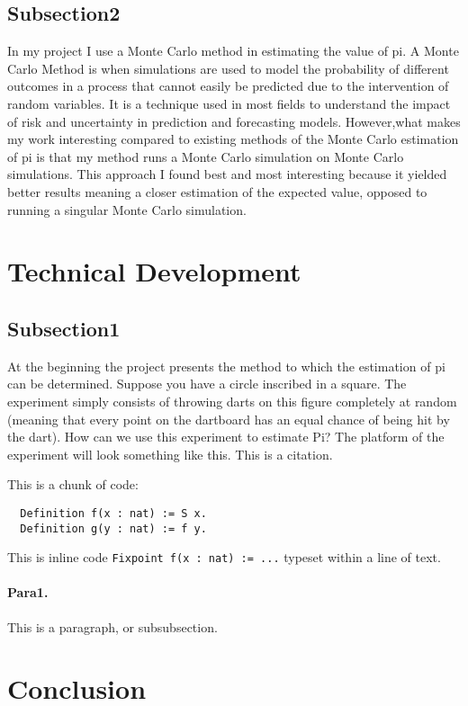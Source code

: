 \documentclass{llncs}
\begin{document}
\subsection{Subsection2} In my project I use a Monte Carlo method in estimating the value of pi. A Monte Carlo Method is when simulations are used to model the probability of different outcomes in a process that cannot easily be predicted due to the intervention of random variables. It is a technique used in most fields to understand the impact of risk and uncertainty in prediction and forecasting models. However,what makes my work interesting compared to existing methods of the Monte Carlo estimation of pi is that my method runs a Monte Carlo simulation on Monte Carlo simulations. This approach I found best and most interesting because it yielded better results meaning a closer estimation of the expected value, opposed to running a singular Monte Carlo simulation.

\section{Technical Development}
\subsection{Subsection1}At the beginning the project presents the method to which the estimation of pi can be determined. Suppose you have a circle inscribed in a square. The experiment simply consists of throwing darts on this figure completely at random (meaning that every point on the dartboard has an equal chance of being hit by the dart). How can we use this experiment to estimate Pi? The platform of the experiment will look something like this.
This is a citation.~\cite{gennaro2010non}

This is a chunk of code:
\begin{lstlisting}
  Definition f(x : nat) := S x.
  Definition g(y : nat) := f y.
\end{lstlisting}

This is inline code \lstinline|Fixpoint f(x : nat) := ...| typeset within a line of text.

\paragraph{Para1.} This is a paragraph, or subsubsection.

\section{Conclusion}



\end{document}
